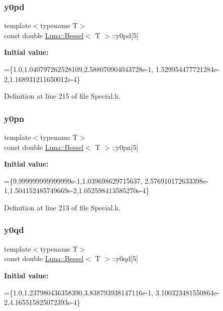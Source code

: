 \subsubsection{\texorpdfstring{y0pd}{y0pd}}
{\footnotesize\ttfamily template$<$typename T$>$ \\
const double \hyperlink{structLuna_1_1Bessel}{Luna\+::\+Bessel}$<$ T $>$\+::y0pd\mbox{[}5\mbox{]}}

{\bfseries Initial value\+:}
\begin{DoxyCode}
=\{1.0,1.040797262528109,2.588070904043728e-1,
        1.529954477721284e-2,1.168931211650012e-4\}
\end{DoxyCode}


Definition at line 215 of file Special.\+h.

\mbox{\label{structLuna_1_1Bessel_a543af2a1841681067dd1f346819d47dc}} 
\subsubsection{\texorpdfstring{y0pn}{y0pn}}
{\footnotesize\ttfamily template$<$typename T$>$ \\
const double \hyperlink{structLuna_1_1Bessel}{Luna\+::\+Bessel}$<$ T $>$\+::y0pn\mbox{[}5\mbox{]}}

{\bfseries Initial value\+:}
\begin{DoxyCode}
=\{9.999999999999999e-1,1.039698629715637,
        2.576910172633398e-1,1.504152485749669e-2,1.052598413585270e-4\}
\end{DoxyCode}


Definition at line 213 of file Special.\+h.

\mbox{\label{structLuna_1_1Bessel_acc0752d48d86fad96a06178f62fb9780}} 
\subsubsection{\texorpdfstring{y0qd}{y0qd}}
{\footnotesize\ttfamily template$<$typename T$>$ \\
const double \hyperlink{structLuna_1_1Bessel}{Luna\+::\+Bessel}$<$ T $>$\+::y0qd\mbox{[}5\mbox{]}}

{\bfseries Initial value\+:}
\begin{DoxyCode}
=\{1.0,1.237980436358390,3.838793938147116e-1,
        3.100323481550864e-2,4.165515825072393e-4\}
\end{DoxyCode}


